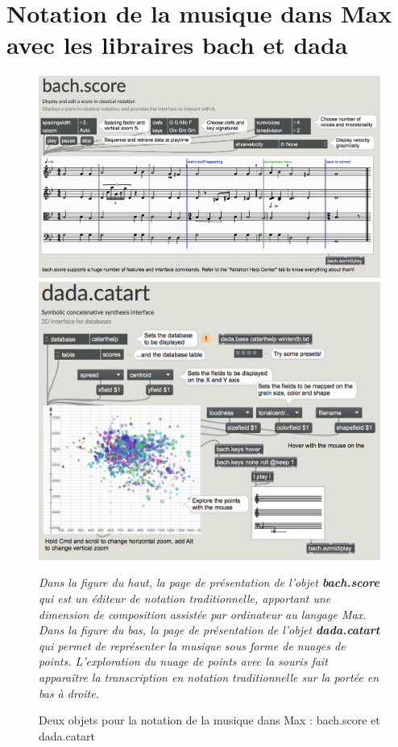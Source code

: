 \section{Notation de la musique dans Max avec les libraires bach et dada}
\label{sec:exempleBachDada}
\begin{figure}[H]
	\centering
	\includegraphics[keepaspectratio=true, height=0.45\textheight, width=\textwidth]{Annexes/i/exempleBachScore.png}
	\includegraphics[keepaspectratio=true, height=0.45\textheight]{Annexes/i/exempleDadaCatart.png}
	\caption{Deux objets pour la notation de la musique dans Max : bach.score et dada.catart}
	\label{fig:exempleBachDada}
	\medskip
	\small
	\it 	
	Dans la figure du haut, la page de présentation de l'objet \textbf{bach.score} qui est un éditeur de notation traditionnelle, apportant une dimension de composition assistée par ordinateur au langage Max. Dans la figure du bas, la page de présentation de l'objet \textbf{dada.catart} qui permet de représenter la musique sous forme de nuages de points. L'exploration du nuage de points avec la souris fait apparaître la transcription en notation traditionnelle sur la portée en bas à droite.
\end{figure}

